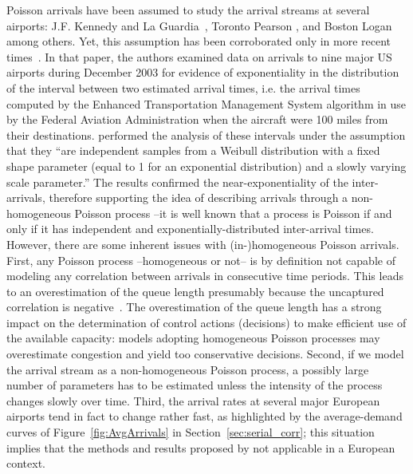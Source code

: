 \documentclass[draft,review]{elsarticle}
\makeatletter
\newcommand*{\ie}{i.e.\@\xspace}
\makeatother
\begin{document}
Poisson arrivals have been assumed to study the arrival streams at several airports:  J.F. Kennedy and La Guardia~\citep{Koop1972}, Toronto Pearson \citep{Bookbinder1986}, and Boston Logan~\citep{HO1975} among others. Yet, this assumption has been corroborated only in more recent times~\citep{willemain2004statistical}.
In that paper, the authors examined data on arrivals to nine major US airports during December 2003 for evidence of exponentiality in the distribution of the interval between two estimated arrival times, \ie{} the arrival times computed by the Enhanced Transportation Management System algorithm in use by the Federal Aviation Administration when the aircraft were 100 miles from their destinations. \citet{willemain2004statistical} performed the analysis of these intervals under the assumption that they ``are independent samples from a Weibull distribution with a fixed shape parameter (equal to 1 for an exponential distribution) and a slowly varying scale parameter.''
The results confirmed the near-exponentiality of the inter-arrivals, therefore supporting the idea of describing arrivals through a non-homogeneous Poisson process --it is well known that a process is Poisson if and only if it has independent and exponentially-distributed inter-arrival times.
However, there are some inherent issues with (in-)homogeneous Poisson arrivals.
First, any Poisson process --homogeneous or not-- is by definition not capable of modeling any correlation between arrivals in consecutive time periods.
This leads to an overestimation of the queue length presumably because the uncaptured correlation is negative~\citep{caccavale2014model}.
The overestimation of the queue length has a strong impact on the determination of control actions (decisions) to make efficient use of the available capacity: models adopting homogeneous Poisson processes may overestimate congestion and yield too conservative decisions.
Second, if we model the arrival stream as a non-homogeneous Poisson process, a possibly large number of parameters has to be estimated unless the intensity of the process changes slowly over time. 
Third, the arrival rates at several major European airports tend in fact to change rather fast, as highlighted by the average-demand curves of Figure~\ref{fig:AvgArrivals} in Section~\ref{sec:serial_corr}; this situation implies that the methods and results proposed by \citet{willemain2004statistical} not applicable in a European context.
\end{document}
